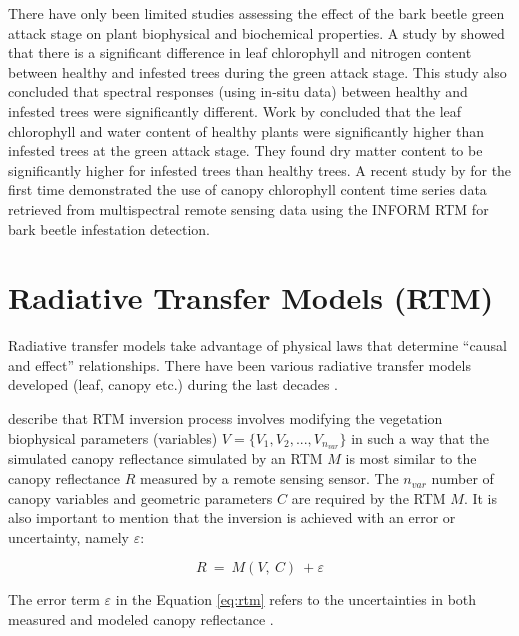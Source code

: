 \documentclass[a4paper, twoside]{templates/ociamthesis}
\begin{document}
There have only been limited studies assessing the effect of the bark beetle green attack stage on plant biophysical and biochemical properties. A study by \citet{abdullah2018european} showed that there is a significant difference in leaf chlorophyll and nitrogen content between healthy and infested trees during the green attack stage. This study also concluded that spectral responses (using in-situ data) between healthy and infested trees were significantly different. Work by \citet{abdullah2019sentinel} concluded that the leaf chlorophyll and water content of healthy plants were significantly higher than infested trees at the green attack stage. They found dry matter content to be significantly higher for infested trees than healthy trees. A recent study by \citet{ali2021canopy} for the first time demonstrated the use of canopy chlorophyll content time series data retrieved from multispectral remote sensing data using the INFORM RTM for bark beetle infestation detection.

\hypertarget{rtm}{%
\chapter{Radiative Transfer Models (RTM)}\label{rtm}}

Radiative transfer models take advantage of physical laws that determine ``causal and effect'' relationships. There have been various radiative transfer models developed (leaf, canopy etc.) during the last decades \citep{verrelst2019quantifying}.

\citet{combal2003retrieval} describe that RTM inversion process involves modifying the vegetation biophysical parameters (variables) \(V = \{V_{1}, V_{2}, ..., V_{n_{var}}\}\) in such a way that the simulated canopy reflectance simulated by an RTM \(M\) is most similar to the canopy reflectance \(R\) measured by a remote sensing sensor. The \(n_{var}\) number of canopy variables and geometric parameters \(C\) are required by the RTM \(M\). It is also important to mention that the inversion is achieved with an error or uncertainty, namely \(\varepsilon\):

\begin{equation}
R\ =\ M\left(V,\ C\right)\ +\varepsilon
\label{eq:rtm}
\end{equation}

The error term \(\varepsilon\) in the Equation \eqref{eq:rtm} refers to the uncertainties in both measured and modeled canopy reflectance \citep{combal2003retrieval}.
\end{document}
